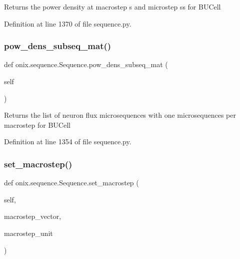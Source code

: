 \begin{DoxyVerb}Returns the power density at macrostep s and microstep ss for BUCell\end{DoxyVerb}
 

Definition at line 1370 of file sequence.\+py.

\mbox{\label{classonix_1_1sequence_1_1Sequence_a85a5edc9d1b97fcc1c4b8c20aa0069b0}} 
\subsubsection{\texorpdfstring{pow\+\_\+dens\+\_\+subseq\+\_\+mat()}{pow\_dens\_subseq\_mat()}}
{\footnotesize\ttfamily def onix.\+sequence.\+Sequence.\+pow\+\_\+dens\+\_\+subseq\+\_\+mat (\begin{DoxyParamCaption}\item[{}]{self }\end{DoxyParamCaption})}

\begin{DoxyVerb}Returns the list of neuron flux microsequences with one microsequences per macrostep
for BUCell\end{DoxyVerb}
 

Definition at line 1354 of file sequence.\+py.

\mbox{\label{classonix_1_1sequence_1_1Sequence_ac5a703466edd1b937689ed12ac3c624d}} 
\subsubsection{\texorpdfstring{set\+\_\+macrostep()}{set\_macrostep()}}
{\footnotesize\ttfamily def onix.\+sequence.\+Sequence.\+set\+\_\+macrostep (\begin{DoxyParamCaption}\item[{}]{self,  }\item[{}]{macrostep\+\_\+vector,  }\item[{}]{macrostep\+\_\+unit }\end{DoxyParamCaption})}

